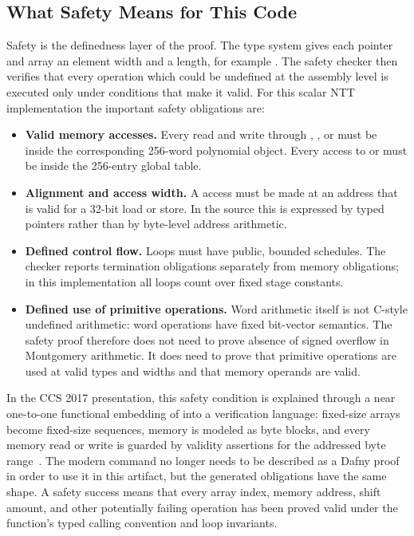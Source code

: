 \subsection{What Safety Means for This Code}

Safety is the definedness layer of the proof.  The \jasmin{} type system gives
each pointer and array an element width and a length, for example
.  The safety checker then verifies that every
operation which could be undefined at the assembly level is executed only
under conditions that make it valid.  For this scalar NTT implementation the
important safety obligations are:
\begin{itemize}
  \item \textbf{Valid memory accesses.}  Every read and write through
        , , or  must be inside the corresponding
        256-word polynomial object.  Every access to  or
         must be inside the 256-entry global table.
  \item \textbf{Alignment and access width.}  A  access must be made
        at an address that is valid for a 32-bit load or store.  In the source
        this is expressed by typed  pointers rather than by
        byte-level address arithmetic.
  \item \textbf{Defined control flow.}  Loops must have public, bounded
        schedules.  The checker reports termination obligations separately
        from memory obligations; in this implementation all loops count over
        fixed stage constants.
  \item \textbf{Defined use of primitive operations.}  Word arithmetic itself
        is not C-style undefined arithmetic: \jasmin{} word operations have
        fixed bit-vector semantics.  The safety proof therefore does not need
        to prove absence of signed overflow in Montgomery arithmetic.  It does
        need to prove that primitive operations are used at valid types and
        widths and that memory operands are valid.
\end{itemize}

In the CCS 2017 presentation, this safety condition is explained through a
near one-to-one functional embedding of \jasmin{} into a verification language:
fixed-size \jasmin{} arrays become fixed-size sequences, memory is modeled as
byte blocks, and every memory read or write is guarded by validity assertions
for the addressed byte range~\cite{Almeida2017}.  The modern
 command no longer needs to be described as a Dafny proof in
order to use it in this artifact, but the generated obligations have the same
shape.  A safety success means that every array index, memory address, shift
amount, and other potentially failing operation has been proved valid under the
function's typed calling convention and loop invariants.

